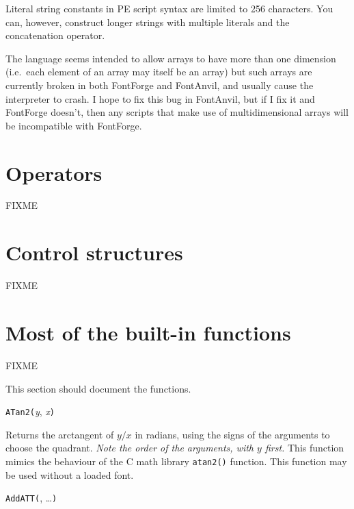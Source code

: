 \begin{framed}
Literal string constants in PE script syntax are limited to 256 characters. 
You can, however, construct longer strings with multiple literals and the
concatenation operator.
\end{framed}

\begin{framed}
The language seems intended to allow arrays to have more than one dimension
(i.e.\ each element of an array may itself be an array) but such arrays are
currently broken in both FontForge and FontAnvil, and usually cause the
interpreter to crash.  I hope to fix this bug in FontAnvil, but if I fix it
and FontForge doesn't, then any scripts that make use of multidimensional
arrays will be incompatible with FontForge.
\end{framed}

\section{Operators}

FIXME

\section{Control structures}

FIXME

\section{Most of the built-in functions}

FIXME

This section should document the functions.



\noindent\texttt{ATan2(}\textit{y}, \textit{x}\texttt{)}

Returns the arctangent of $y/x$ in radians, using the signs of the arguments
to choose the quadrant.  \emph{Note the order of the arguments, with $y$
first.}  This function mimics the behaviour of the C math library
\texttt{atan2()} function.  This function may be used without a
loaded font.


\noindent\texttt{AddATT(}, \ldots\texttt{)}


